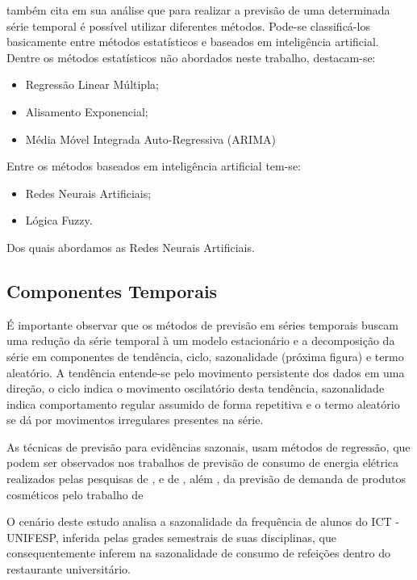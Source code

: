 \documentclass[	12pt, Times, openright, twoside, a4paper, english, brazil]{abntex2}
\begin{document}
          \cite{Almeida2013} também cita  em sua análise que para realizar a previsão de uma determinada série temporal é possível utilizar diferentes métodos. Pode-se classificá-los basicamente entre métodos estatísticos e baseados em inteligência artificial.
          Dentre os métodos estatísticos não abordados neste trabalho, destacam-se:
          \begin{itemize}
              \item Regressão Linear Múltipla;
              \item Alisamento Exponencial;
              \item Média Móvel Integrada Auto-Regressiva (ARIMA)
          \end{itemize}
          Entre os métodos baseados em inteligência artificial tem-se:
          \begin{itemize}
              \item Redes Neurais Artificiais;
              \item Lógica Fuzzy.
          \end{itemize}
          Dos quais abordamos as Redes Neurais Artificiais.

        \subsection{Componentes Temporais}

          É importante observar que os métodos de previsão em séries temporais buscam uma redução da série temporal à um modelo estacionário e a decomposição da série em componentes de tendência, ciclo, sazonalidade (próxima figura) e termo aleatório. A tendência entende-se pelo movimento persistente dos dados em uma direção, o ciclo indica o movimento oscilatório desta tendência, sazonalidade indica comportamento regular assumido de forma repetitiva e o termo aleatório se dá por movimentos irregulares presentes na série.
           
          As técnicas de previsão para evidências sazonais, usam métodos de regressão, que podem ser observados nos trabalhos de previsão de consumo de energia elétrica realizados pelas pesquisas de \cite{Almeida2013}, \cite{RUAS2012} e de \cite{Silva2010}, além , da previsão de demanda de produtos cosméticos pelo trabalho de \cite{Junior2007}

          O cenário deste estudo analisa a sazonalidade da frequência de alunos do ICT - UNIFESP, inferida pelas grades semestrais de suas disciplinas, que consequentemente inferem na sazonalidade de consumo de refeições dentro do restaurante universitário.\newline
          
\end{document}
